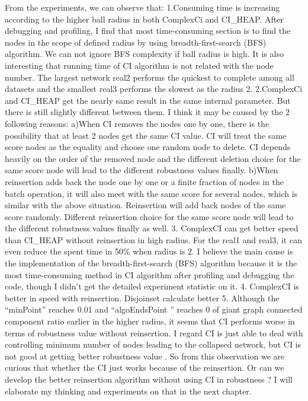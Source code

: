 \documentclass{article}
\begin{document}
	From the experiments, we can observe that:
	1.Consuming time is increasing according to the higher ball radius in both ComplexCi and CI\_HEAP. After debugging and profiling, I find that most time-consuming section is to find the nodes in the scope of defined radius by using breadth-first-search (BFS) algorithm. We can not ignore BFS complexity if ball radius is high. It is also interesting that running time of CI algorithm is not related with the node number. The largest network real2 performs the quickest to complete among all datasets and the smallest real3 performs the slowest as the radius 2. 
	2.ComplexCi and CI\_HEAP get the nearly same result in the same internal parameter. But there is still slightly different between them. I think it may be caused by the 2 following reasons:
	a)When CI removes the nodes one by one, there is the possibility that at least 2 nodes get the same CI value. CI will treat the same score nodes as the equality and choose one random node to delete. CI depends heavily on the order of the removed node and the different deletion choice for the same score node will lead to the different robustness values finally. 
	b)When reinsertion adds back the node one by one or a finite fraction of nodes in the batch operation, it will also meet with the same score for several nodes, which is similar with the above situation. Reinsertion will add back nodes of the same score randomly. Different reinsertion choice for the same score node will lead to the different robustness values finally as well.
	3. ComplexCI can get better speed than CI\_HEAP without reinsertion in high radius. For the real1 and real3, it can even reduce the spent time in 50\% when radius is 2. I believe the main cause is the implementation of the breadth-first-search (BFS) algorithm because it is the most time-consuming method in CI algorithm after profiling and debugging the code, though I didn’t get the detailed experiment statistic on it. 	
	4. ComplexCI is better in speed with reinsertion. Disjoinset calculate better 
	5. Although the “minPoint” reaches 0.01 and “algoEndsPoint ” reaches 0 of giant graph connected component ratio earlier in the higher radius, it seems that CI performs worse in terms of robustness value without reinsertion. I regard CI is just able to deal with controlling minimum number of nodes leading to the collapsed network, but CI is not good at getting better robustness value . So from this observation we are curious that whether the CI just works because of the reinsertion. Or can we develop the better reinsertion algorithm without using CI in robustness ? I will elaborate my thinking and experiments on that in the next chapter.	
\end{document}
